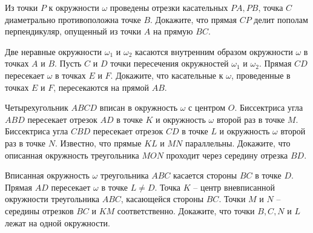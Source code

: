 \documentclass{article}
\begin{document}
\begin{enumerate_boxed}
        \item Из точки $P$ к окружности $\omega$ проведены отрезки касательных $PA, PB$, точка $C$ диаметрально противоположна точке $B$.
        Докажите, что прямая $CP$ делит пополам перпендикуляр, опущенный из точки $A$ на прямую $BC$.

        \item Две неравные окружности $\omega_1$ и $\omega_2$ касаются внутренним образом окружности $\omega$ в точках $A$ и $B$.
        Пусть $C$ и $D$ точки пересечения окружностей $\omega_1$ и $\omega_2$.
        Прямая $CD$ пересекает $\omega$ в точках $E$ и $F$.
        Докажите, что касательные к $\omega$, проведенные в точках $E$ и $F$, пересекаются на прямой $AB$.

        \item Четырехугольник $ABCD$ вписан в окружность $\omega$ с центром $O$.
        Биссектриса угла $ABD$ пересекает отрезок $AD$ в точке $K$ и окружность $\omega$ второй раз в точке $M$.
        Биссектриса угла $CBD$ пересекает отрезок $CD$ в точке $L$ и окружность $\omega$ второй раз в точке $N$.
        Известно, что прямые $KL$ и $MN$ параллельны.
        Докажите, что описанная окружность треугольника $MON$ проходит через середину отрезка $BD$.

        \item Вписанная окружность $\omega$ треугольника $ABC$ касается стороны $BC$ в точке $D$.
        Прямая $AD$ пересекает $\omega$ в точке $L \neq D$.
        Точка $K$ – центр вневписанной окружности треугольника $ABC$, касающейся стороны $BC$.
        Точки $M$ и $N$ – середины отрезков $BC$ и $KM$ соответственно.
        Докажите, что точки $B, C, N$ и $L$ лежат на одной окружности.

    \end{enumerate_boxed}
\end{document}
